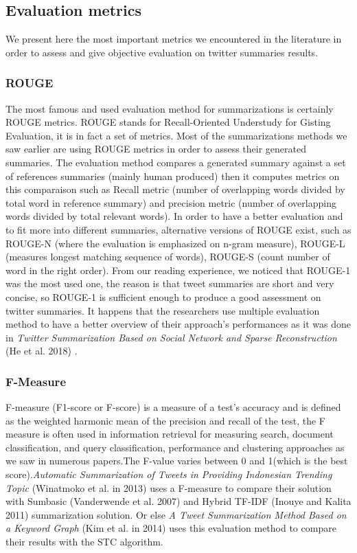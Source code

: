 \documentclass{llncs}
\begin{document}
\subsection{Evaluation metrics}

We present here the most important metrics we encountered in the literature in
order to assess and give objective evaluation on twitter summaries results.

\subsubsection{ROUGE}

The most famous and used evaluation method for summarizations is certainly ROUGE
metrics. ROUGE stands for Recall-Oriented Understudy for Gisting Evaluation, it
is in fact a set of metrics. Most of the summarizations methods we saw earlier
are using ROUGE metrics in order to assess their generated summaries.
The evaluation method compares a generated summary against a set of references
summaries (mainly human produced) then it computes metrics on this comparaison
such as Recall metric (number of overlapping words divided by total word in
reference summary) and precision metric (number of overlapping words divided by
total relevant words). In order to have a better evaluation and to fit more into
different summaries, alternative versions of ROUGE exist, such as ROUGE-N
(where the evaluation is emphasized on n-gram measure), ROUGE-L (measures
longest matching sequence of words), ROUGE-S (count number of word in the right
order). From our reading experience, we noticed that ROUGE-1 was the most used
one, the reason is that tweet summaries are short and very concise, so ROUGE-1
is sufficient enough to produce a good assessment on twitter summaries. It
happens that the researchers use multiple evaluation method to have a better
overview of their approach's performances as it was done in \textit{Twitter
Summarization Based on Social Network and Sparse Reconstruction} (He et al.
2018) \cite{he_twitter_nodate}.

\subsubsection{F-Measure}

F-measure (F1-score or F-score) is a measure of a test's accuracy and is
defined as the weighted harmonic mean of the precision and recall of the test,
the F measure is often used in information retrieval for measuring search,
document classification, and query classification, performance and clustering
approaches as we saw in numerous papers.The F-value varies between 0 and
1(which is the best score).\textit{Automatic Summarization of Tweets in
Providing Indonesian Trending Topic} (Winatmoko et al. in 2013)
\cite{winatmoko_automatic_2013} uses a F-measure to compare their solution with
Sumbasic (Vanderwende et al. 2007) \cite{vanderwende_beyond_2007} and Hybrid
TF-IDF (Inouye and Kalita 2011) \cite{inouye_comparing_2011} summarization
solution. Or else \textit{A Tweet Summarization Method Based on a Keyword
Graph} (Kim et al. in 2014) \cite{kim_tweet_2014} uses this evaluation method
to compare their results with the STC algorithm.
\end{document}
